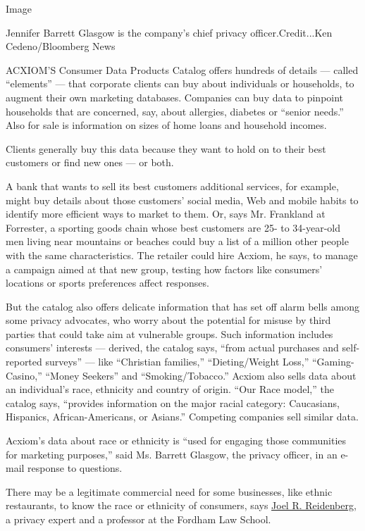 Image

Jennifer Barrett Glasgow is the company's chief privacy
officer.Credit...Ken Cedeno/Bloomberg News

ACXIOM'S Consumer Data Products Catalog offers hundreds of details ---
called ``elements'' --- that corporate clients can buy about individuals
or households, to augment their own marketing databases. Companies can
buy data to pinpoint households that are concerned, say, about
allergies, diabetes or ``senior needs.'' Also for sale is information on
sizes of home loans and household incomes.

Clients generally buy this data because they want to hold on to their
best customers or find new ones --- or both.

A bank that wants to sell its best customers additional services, for
example, might buy details about those customers' social media, Web and
mobile habits to identify more efficient ways to market to them. Or,
says Mr. Frankland at Forrester, a sporting goods chain whose best
customers are 25- to 34-year-old men living near mountains or beaches
could buy a list of a million other people with the same
characteristics. The retailer could hire Acxiom, he says, to manage a
campaign aimed at that new group, testing how factors like consumers'
locations or sports preferences affect responses.

But the catalog also offers delicate information that has set off alarm
bells among some privacy advocates, who worry about the potential for
misuse by third parties that could take aim at vulnerable groups. Such
information includes consumers' interests --- derived, the catalog says,
``from actual purchases and self-reported surveys'' --- like ``Christian
families,'' ``Dieting/Weight Loss,'' ``Gaming-Casino,'' ``Money
Seekers'' and ``Smoking/Tobacco.'' Acxiom also sells data about an
individual's race, ethnicity and country of origin. ``Our Race model,''
the catalog says, ``provides information on the major racial category:
Caucasians, Hispanics, African-Americans, or Asians.'' Competing
companies sell similar data.

Acxiom's data about race or ethnicity is ``used for engaging those
communities for marketing purposes,'' said Ms. Barrett Glasgow, the
privacy officer, in an e-mail response to questions.

There may be a legitimate commercial need for some businesses, like
ethnic restaurants, to know the race or ethnicity of consumers, says
\href{http://law.fordham.edu/faculty/1134.htm}{Joel R. Reidenberg}, a
privacy expert and a professor at the Fordham Law School.

